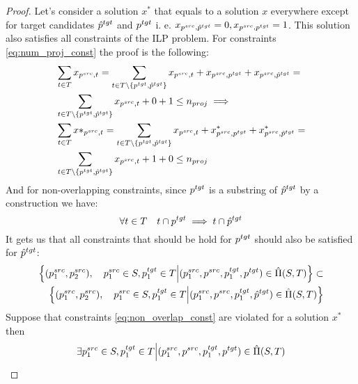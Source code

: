 \begin{proof}
    Let's consider a solution \( x^* \) that equals
    to a solution \( x \) everywhere except for target candidates \( \hat{p}^{tgt}  \) and \(  p^{tgt} \)
    i. e. \( x_{p^{src}, \hat{p}^{tgt}} = 0, x_{p^{src}, p^{tgt}} = 1 \). This solution also satisfies all constraints
    of the ILP problem. For constraints \eqref{eq:num_proj_const} the proof is the following:
    \begin{align*}
         & \sum\limits_{t \in T} x_{p^{src}, t} =
        \sum\limits_{t \in T \setminus \{ p^{tgt}, \hat{p}^{tgt} \}} x_{p^{src}, t} + x_{p^{src}, p^{tgt}} + x_{p^{src}, \hat{p}^{tgt}}  =     \\
         & \sum\limits_{t \in T \setminus \{ p^{tgt}, \hat{p}^{tgt} \}} x_{p^{src}, t} + 0 + 1
        \leq n_{proj} \implies                                                                                                                 \\
         & \sum\limits_{t \in T} x*_{p^{src}, t} =
        \sum\limits_{t \in T \setminus \{ p^{tgt}, \hat{p}^{tgt} \}} x_{p^{src}, t} + x^*_{p^{src}, p^{tgt}} + x^*_{p^{src}, \hat{p}^{tgt}}  = \\
         & \sum\limits_{t \in T \setminus \{ p^{tgt}, \hat{p}^{tgt} \}} x_{p^{src}, t} + 1 + 0 \leq n_{proj}
    \end{align*}
    And for non-overlapping constraints, since \( p^{tgt} \) is a substring of \( \hat{p}^{tgt} \) by a
    construction we have:
    \[
        \forall t \in T \quad t \cap p^{tgt} \implies t \cap \hat{p}^{tgt}
    \]
    It gets us that all constraints that should be hold for \( p^{tgt} \) should also be satisfied for \( \hat{p}^{tgt} \):
    \begin{equation} \label{eq:overlap_substring}
        \begin{aligned}
            \left\{ (p_1^{src}, p_2^{src}), \quad p_1^{src} \in S, p_1^{tgt} \in T \Big| (p_1^{src}, p^{src}, p_1^{tgt}, p^{tgt}) \in \hat{\Pi}(S, T) \right\} \subset \\
            \left\{ (p_1^{src}, p_2^{src}), \quad p_1^{src} \in S, p_1^{tgt} \in T \Big| (p_1^{src}, p^{src}, p_1^{tgt}, \hat{p}^{tgt}) \in \hat{\Pi}(S, T) \right\}
        \end{aligned}
    \end{equation}
    Suppose that constraints \eqref{eq:non_overlap_const} are violated for a solution \( x^* \) then
    \begin{align*}
         & \exists \src{p_1} \in S, \tgt{p_1} \in T \Big| (\src{p_1}, \src{p}, \tgt{p_1}, \tgt{p}) \in \hat{\Pi}(S, T) \\

\end{align*}
\end{proof}
